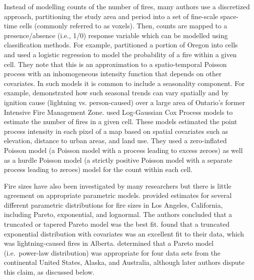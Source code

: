\documentclass[10pt,letterpaper]{article}
\begin{document}
Instead of modelling counts of the number of fires, many authors
\cite{brillingerRiskAssessmentForest2003,preislerProbabilityBasedModels2004,vilarModelPredictingHumancaused2010,woolfordSpatiotemporalModelPeopleCaused2011} use a discretized approach, partitioning the study area and period into a set of fine-scale space-time cells (commonly referred to as voxels). Then, counts are mapped to a presence/absence (i.e., 1/0) response variable which can be modelled using classification methods. For example, \cite{brillingerRiskAssessmentForest2003} partitioned a portion of
Oregon into cells and used a logistic regression to model the
probability of a fire within a given cell. They note that this is an
approximation to a spatio-temporal Poisson process with an inhomogeneous intensity function that depends on other covariates.
In such models it is common to include a seasonality component. For example, \cite{woolfordSitespecificSeasonalBaselines2009} demonstrated how such seasonal trends can vary spatially and by ignition cause (lightning vs. person-caused) over a large area of Ontario's former Intensive Fire Management Zone. \cite{serraSpatiotemporalLogGaussianCox2014} used
Log-Gaussian Cox Process models to estimate the number of fires in a
given cell. These models estimated the point
process intensity in each pixel of a map based on spatial covariates such as
elevation, distance to urban areas, and land use. They used a zero-inflated
Poisson model (a Poisson model with a process leading to excess zeroes) as well as a hurdle Poisson model (a strictly positive Poisson model with a separate process leading to zeroes) model for the count within each cell.

Fire sizes have also been investigated by many researchers but there is
little agreement on appropriate parametric models.
\cite{schoenbergDistributionWildfireSizes2003} provided estimates for
several different parametric distributions for fire sizes in Los
Angeles, California, including Pareto, exponential, and lognormal. The
authors concluded that a truncated or tapered Pareto model was the best
fit. \cite{cummingParametricModelFiresize2001} found that a truncated
exponential distribution with covariates was an excellent fit to their
data, which was lightning-caused fires in Alberta.
\cite{malamudForestFiresExample1998} determined that a Pareto model
(i.e.~power-law distribution) was appropriate for four data sets from
the continental United States, Alaska, and Australia, although later
authors dispute this claim, as discussed below.
\end{document}
